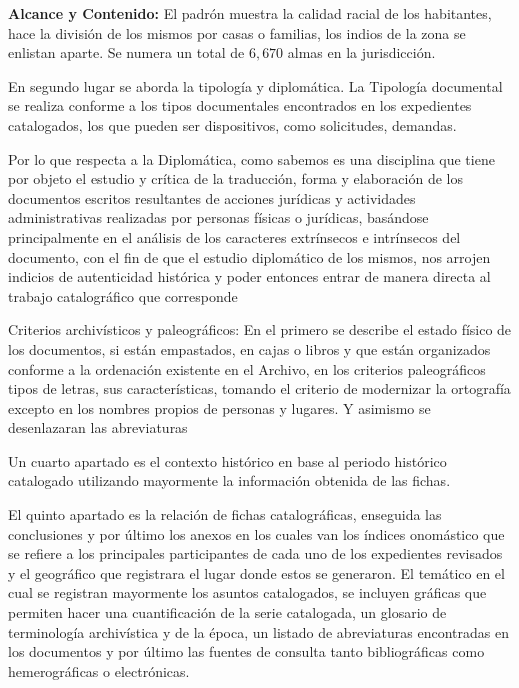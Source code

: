 \bigskip
{}
\enlargethispage{1\baselineskip}

\noindent \textbf{Alcance y Contenido:} El padrón muestra la 
calidad racial de los habitantes, hace la división de los mismos por 
casas o familias, los indios de la zona se enlistan aparte. Se numera 
un total de $6, 670$ almas en la jurisdicción.
\newpage

En segundo lugar se aborda la tipología y diplomática. La Tipología 
documental se realiza conforme a los tipos documentales encontrados en 
los expedientes catalogados, los que pueden ser dispositivos, como 
solicitudes, demandas.

Por lo que respecta a la Diplomática, como sabemos es una disciplina 
que tiene por objeto el estudio y crítica de la traducción, forma y 
elaboración de los documentos escritos resultantes de acciones 
jurídicas y actividades administrativas realizadas por personas físicas 
o jurídicas, basándose principalmente en el análisis de los caracteres 
extrínsecos e intrínsecos del documento, con el fin de que el estudio 
diplomático de los mismos, nos arrojen indicios de autenticidad 
histórica y poder entonces entrar de manera directa al trabajo 
catalográfico que corresponde

Criterios archivísticos y paleográficos: En el primero se describe el 
estado físico de los documentos, si están empastados, en cajas o libros 
y que están organizados conforme a la ordenación existente en el 
Archivo, en los criterios paleográficos tipos de letras, sus 
características, tomando el criterio de modernizar la ortografía 
excepto en los nombres propios de personas y lugares. Y asimismo se 
desenlazaran las abreviaturas

Un cuarto apartado es el contexto histórico en base al periodo 
histórico catalogado utilizando mayormente la información obtenida de 
las fichas.

\enlargethispage{1\baselineskip}
El quinto apartado es la relación de fichas catalográficas, enseguida 
las conclusiones y por último los anexos en los cuales van los índices 
onomástico que se refiere a los principales participantes de cada uno 
de los expedientes revisados y el geográfico que registrara el lugar 
donde estos se generaron. El temático en el cual se registran 
mayormente los asuntos catalogados, se incluyen gráficas que permiten 
hacer una cuantificación de la serie catalogada, un glosario de 
terminología archivística y de la época, un listado de abreviaturas 
encontradas en los documentos y por último las fuentes de consulta 
tanto bibliográficas como hemerográficas o electrónicas.

